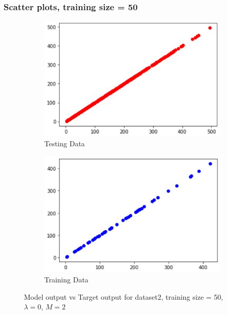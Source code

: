 \documentclass[11pt]{article}
\begin{document}
\subsubsection{Scatter plots, training size = 50}
\begin{figure}[h]
\centering
	\begin{subfigure}[b]{0.4\textwidth}
	\centering
	\includegraphics[scale=0.5]{dataset2_50_lambda0_test.jpg}
	\caption{Testing Data}
	\label{fig:fig2.1.4.1}
	\end{subfigure}
	\hfill
	\begin{subfigure}[b]{0.4\textwidth}
	\centering
	\includegraphics[scale=0.5]{dataset2_50_lambda0_train.jpg}
	\caption{Training Data}
	\label{fig:fig2.1.4.2}
	\end{subfigure}
\caption{Model output vs Target output for dataset2, training size = 50, $\lambda = 0$, $M =2 $}
\label{fig:fig2.1.4}
\end{figure}
\end{document}
